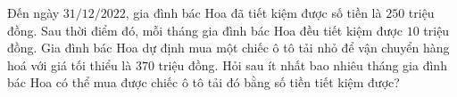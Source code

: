 \begin{bt}
	Đến ngày $31 / 12 / 2022$, gia đình bác Hoa đã tiết kiệm được số tiền là $250$ triệu đồng. Sau thời điểm đó, mỗi tháng gia đình bác Hoa đều tiết kiệm được $10$ triệu đồng. Gia đình bác Hoa dự định mua một chiếc ô tô tải nhỏ để vận chuyển hàng hoá với giá tối thiểu là $370$ triệu đồng. Hỏi sau ít nhất bao nhiêu tháng gia đình bác Hoa có thể mua được chiếc ô tô tải đó bằng số tiền tiết kiệm được?
\end{bt}
